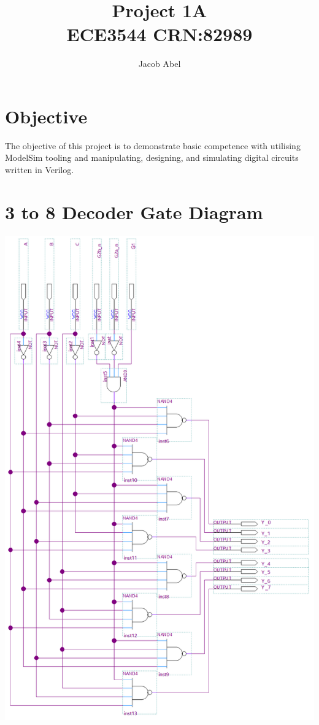 \documentclass[12pt,letterpaper,titlepage]{article}
\author{Jacob Abel}
\title{	Project 1A
	\\\large ECE3544 CRN:82989
}
\begin{document}


\maketitle
\begin{raggedright}

\section*{Objective}

The objective of this project is to demonstrate basic competence with utilising ModelSim tooling and manipulating, designing, and simulating digital circuits written in Verilog.

\section{3 to 8 Decoder Gate Diagram}
\begin{center}
\includegraphics[width=\textwidth, height=0.8\textheight, keepaspectratio=true]{3to8}
\end{center}


\end{raggedright}
\end{document}
